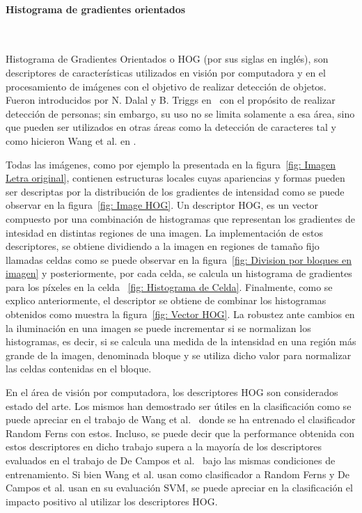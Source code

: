 \paragraph{Histograma de gradientes orientados} ~\\
\label{subsection:hog}

	Histograma de Gradientes Orientados o HOG (por sus siglas en inglés), son descriptores de características utilizados en visión por computadora y en el procesamiento de imágenes con el objetivo de realizar detección de objetos. Fueron introducidos por N. Dalal y B. Triggs en~\cite{DT05} con el propósito de realizar detección de personas; sin embargo, su uso no se limita solamente a esa área, sino que pueden ser utilizados en otras áreas como la detección de caracteres tal y como hicieron Wang et al. en \cite{wang}.
	
	Todas las imágenes, como por ejemplo la presentada en la figura~\ref{fig: Imagen Letra original}, contienen estructuras locales cuyas apariencias y formas pueden ser descriptas por la distribución de los gradientes de intensidad como se puede observar en la figura~\ref{fig: Image HOG}.	Un descriptor HOG, es un vector compuesto por una combinación de histogramas que representan los gradientes de intesidad en distintas regiones de una imagen. La implementación de estos descriptores, se obtiene dividiendo a la imagen en regiones de tamaño fijo llamadas celdas como se puede observar en la figura~\ref{fig: Division por bloques en imagen} y posteriormente, por cada celda, se calcula un histograma de gradientes para los píxeles en la celda ~\ref{fig: Histograma de Celda}. Finalmente, como se explico anteriormente, el descriptor se obtiene de combinar los histogramas obtenidos como muestra la figura~\ref{fig: Vector HOG}. La robustez ante cambios en la iluminación en una imagen se puede incrementar si se normalizan los histogramas, es decir, si se calcula una medida de la intensidad en una región más grande de la imagen, denominada bloque y se utiliza dicho valor para normalizar las celdas contenidas en el bloque.
	
	
	En el área de visión por computadora, los descriptores HOG son considerados estado del arte. Los mismos han demostrado ser útiles en la clasificación como se puede apreciar en el trabajo de Wang et al.~\cite{wang} donde se ha entrenado el clasificador Random Ferns con estos. Incluso, se puede decir que la performance obtenida con estos descriptores en dicho trabajo supera a la mayoría de los descriptores evaluados en el trabajo de De Campos et al.~\cite{dCBV09} bajo las mismas condiciones de entrenamiento. Si bien Wang et al. usan como clasificador a Random Ferns y De Campos et al. usan en su evaluación SVM, se puede apreciar en la clasificación el impacto positivo al utilizar los descriptores HOG.
	
